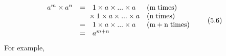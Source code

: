         \label{m38359*uid12}\nopagebreak\noindent{}
    \begin{equation}
    \begin{array}{cccc}\hfill {a}^{m}\ensuremath{\times}{a}^{n}& =& 1\ensuremath{\times}a\ensuremath{\times}...\ensuremath{\times}a\hfill & \left(\mathrm{m\; times}\right)\hfill \\ \hfill & & \phantom{\rule{-0.166667em}{0ex}}\phantom{\rule{-0.166667em}{0ex}}\phantom{\rule{-0.166667em}{0ex}}\phantom{\rule{-0.166667em}{0ex}}\ensuremath{\times}1\ensuremath{\times}a\ensuremath{\times}...\ensuremath{\times}a\hfill & \left(\mathrm{n\; times}\right)\hfill \\ \hfill & =& 1\ensuremath{\times}a\ensuremath{\times}...\ensuremath{\times}a\hfill & \left(\mathrm{m}+\mathrm{n\; times}\right)\hfill \\ \hfill & =& {a}^{m+n}\hfill & \end{array}\tag{5.6}
      \end{equation}
        \label{m38359*id64082}For example,\par 
        \label{m38359*id64085}\nopagebreak\noindent{}
          
